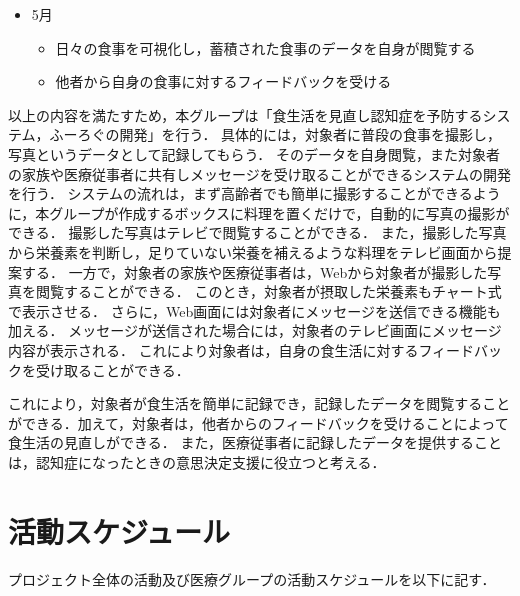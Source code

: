 \documentclass[../report]{subfiles}
\begin{document}
\begin{itemize}
    \item[] 5月
    \begin{itemize}
        \item 日々の食事を可視化し，蓄積された食事のデータを自身が閲覧する
        \item 他者から自身の食事に対するフィードバックを受ける
    \end{itemize}
\end{itemize}

以上の内容を満たすため，本グループは「食生活を見直し認知症を予防するシステム，ふーろぐの開発」を行う．
具体的には，対象者に普段の食事を撮影し，写真というデータとして記録してもらう．
そのデータを自身閲覧，また対象者の家族や医療従事者に共有しメッセージを受け取ることができるシステムの開発を行う．
システムの流れは，まず高齢者でも簡単に撮影することができるように，本グループが作成するボックスに料理を置くだけで，自動的に写真の撮影ができる．
撮影した写真はテレビで閲覧することができる．
また，撮影した写真から栄養素を判断し，足りていない栄養を補えるような料理をテレビ画面から提案する．
一方で，対象者の家族や医療従事者は，Webから対象者が撮影した写真を閲覧することができる．
このとき，対象者が摂取した栄養素もチャート式で表示させる．
さらに，Web画面には対象者にメッセージを送信できる機能も加える．
メッセージが送信された場合には，対象者のテレビ画面にメッセージ内容が表示される．
これにより対象者は，自身の食生活に対するフィードバックを受け取ることができる．

これにより，対象者が食生活を簡単に記録でき，記録したデータを閲覧することができる．加えて，対象者は，他者からのフィードバックを受けることによって食生活の見直しができる．
また，医療従事者に記録したデータを提供することは，認知症になったときの意思決定支援に役立つと考える．


\section{活動スケジュール}
プロジェクト全体の活動及び医療グループの活動スケジュールを以下に記す．
\end{document}
